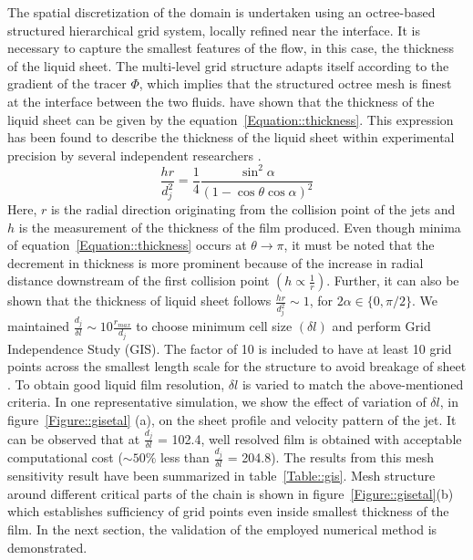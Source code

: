 The spatial discretization of the domain is undertaken using an octree-based structured hierarchical grid system, locally refined near the interface. It is necessary to capture the smallest features of the flow, in this case, the thickness of the liquid sheet. The multi-level grid structure adapts itself according to the gradient of the tracer $\Phi$, which implies that the structured octree mesh is finest at the interface between the two fluids. \cite{hasson1964thickness,choo2001parametric} have shown that the thickness of the liquid sheet can be given by the equation~\ref{Equation::thickness}. This expression has been found to describe the thickness of the liquid sheet within experimental precision by several independent researchers \citep{poulikakos1998thickness,choo2001parametric,ekimova2015liquid}.
\begin{equation}\label{Equation::thickness}
\frac{hr}{d_j^2} = \frac{1}{4}\frac{\sin^2\alpha}{(1-\cos\theta\cos\alpha)^2}
\end{equation} 
Here, $r$ is the radial direction originating from the collision point of the jets and $h$ is the measurement of the thickness of the film produced. Even though minima of equation~\ref{Equation::thickness} occurs at $\theta \to \pi$, it must be noted that the decrement in thickness is more prominent because of the increase in radial distance downstream of the first collision point $\left(h \propto \frac{1}{r}\right)$. Further, it can also be shown that the thickness of liquid sheet follows $\frac{hr}{d_j^2} \sim 1$, for $2\alpha \in \{0,\pi/2\}$. We maintained $\frac{d_j}{\delta l} \sim 10\frac{r_{max}}{d_j}$ to choose minimum cell size $\left(\delta l\right)$ and perform Grid Independence Study (GIS). The factor of 10 is included to have at least 10 grid points \citep{ling2015multiscale} across the smallest length scale for the structure to avoid breakage of sheet \citep{chen2013high}. To obtain good liquid film resolution, $\delta l$ is varied to match the above-mentioned criteria. In one representative simulation, we show the effect of variation of $\delta l$, in figure~\ref{Figure::gisetal} (a), on the sheet profile and velocity pattern of the jet. It can be observed that at $\frac{d_j}{\delta l}$ = 102.4, well resolved film is obtained with acceptable computational cost ($\sim 50\%$ less than $\frac{d_j}{\delta l}$ = 204.8). The results from this mesh sensitivity result have been summarized in table~\ref{Table::gis}. Mesh structure around different critical parts of the chain is shown in figure~\ref{Figure::gisetal}(b) which establishes sufficiency of grid points even inside smallest thickness of the film. In the next section, the validation of the employed numerical method is demonstrated.
